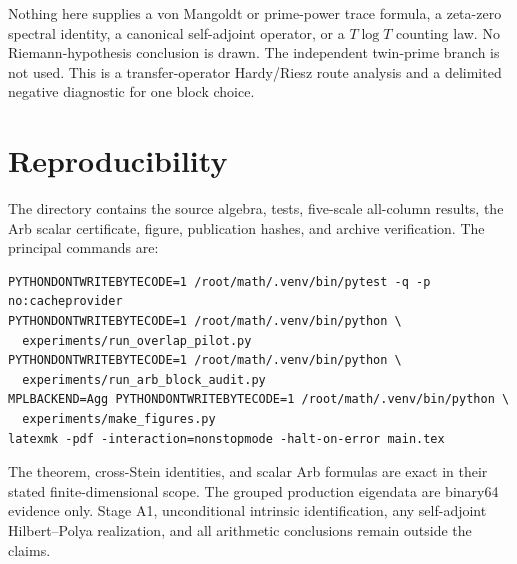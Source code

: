 \documentclass[11pt]{article}
\theoremstyle{remark}
\begin{document}
Nothing here supplies a von Mangoldt or prime-power trace formula, a zeta-zero
spectral identity, a canonical self-adjoint operator, or a $T\log T$ counting
law.  No Riemann-hypothesis conclusion is drawn.  The independent twin-prime
branch is not used.  This is a transfer-operator Hardy/Riesz route analysis
and a delimited negative diagnostic for one block choice.

\section{Reproducibility}

The directory contains the source algebra, tests, five-scale all-column
results, the Arb scalar certificate, figure, publication hashes, and archive
verification.  The principal commands are:
\begin{verbatim}
PYTHONDONTWRITEBYTECODE=1 /root/math/.venv/bin/pytest -q -p no:cacheprovider
PYTHONDONTWRITEBYTECODE=1 /root/math/.venv/bin/python \
  experiments/run_overlap_pilot.py
PYTHONDONTWRITEBYTECODE=1 /root/math/.venv/bin/python \
  experiments/run_arb_block_audit.py
MPLBACKEND=Agg PYTHONDONTWRITEBYTECODE=1 /root/math/.venv/bin/python \
  experiments/make_figures.py
latexmk -pdf -interaction=nonstopmode -halt-on-error main.tex
\end{verbatim}

The theorem, cross-Stein identities, and scalar Arb formulas are exact in
their stated finite-dimensional scope.  The grouped production eigendata are
binary64 evidence only.  Stage A1, unconditional intrinsic identification,
any self-adjoint Hilbert--Polya realization, and all arithmetic conclusions
remain outside the claims.



\end{document}
